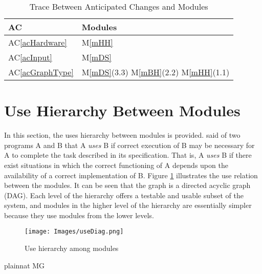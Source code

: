 \documentclass[12pt, titlepage]{article}
\newcommand{\acref}[1]{AC\ref{#1}}
\newcommand{\mref}[1]{M\ref{#1}}
\begin{document}
\begin{table}[H]
\centering
\begin{tabular}{p{} p{}}
\toprule
\textbf{AC} & \textbf{Modules}\\
\midrule
\acref{acHardware} & \mref{mHH}\\
\acref{acInput} & \mref{mDS}\\
\acref{acGraphType} & \mref{mDS}(3.3) \mref{mBH}(2.2) \mref{mHH}(1.1)\\
\bottomrule
\end{tabular}
\caption{Trace Between Anticipated Changes and Modules}
\label{TblACT}
\end{table}

\section{Use Hierarchy Between Modules} \label{SecUse}%

In this section, the uses hierarchy between modules is
provided. \citet{Parnas1978} said of two programs A and B that A {\em uses} B if
correct execution of B may be necessary for A to complete the task described in
its specification. That is, A {\em uses} B if there exist situations in which
the correct functioning of A depends upon the availability of a correct
implementation of B.  Figure \ref{FigUH} illustrates the use relation between
the modules. It can be seen that the graph is a directed acyclic graph
(DAG). Each level of the hierarchy offers a testable and usable subset of the
system, and modules in the higher level of the hierarchy are essentially simpler
because they use modules from the lower levels.

\begin{figure}[H]
\centering
\caption{Use hierarchy among modules}
\label{FigUH}
\begin{center}
	\texttt{[image: Images/useDiag.png]}
\end{center}
\end{figure}


 {plainnat}
 {MG}
\end{document}
